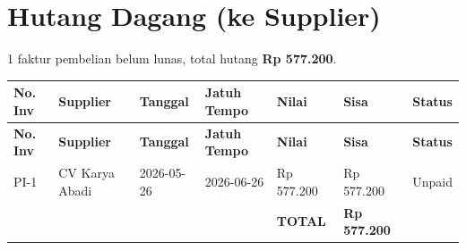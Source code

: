 \documentclass[11pt,a4paper]{article}
\begin{document}
\section{Hutang Dagang (ke Supplier)}
1 faktur pembelian belum lunas, total hutang \textbf{Rp 577.200}.

{\setlength{\tabcolsep}{5pt}\small
\begin{longtable}{l p{3.2cm} l l R{2.4cm} R{2.4cm} l}
\toprule
\textbf{No. Inv} & \textbf{Supplier} & \textbf{Tanggal} & \textbf{Jatuh Tempo} & \textbf{Nilai} & \textbf{Sisa} & \textbf{Status} \\
\midrule\endfirsthead
\toprule
\textbf{No. Inv} & \textbf{Supplier} & \textbf{Tanggal} & \textbf{Jatuh Tempo} & \textbf{Nilai} & \textbf{Sisa} & \textbf{Status} \\
\midrule\endhead
\bottomrule\endfoot
PI-1 & CV Karya Abadi & 2026-05-26 & 2026-06-26 & Rp 577.200 & Rp 577.200 & Unpaid \\
 &  &  &  & \textbf{TOTAL} & \textbf{Rp 577.200} &  \\
\end{longtable}}
\end{document}

